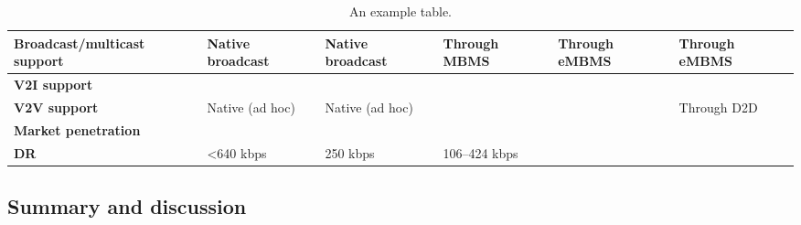 \begin{table}[h!]
\begin{tabulary}{\columnwidth}{L|L|L|L|L|L}
	\bf{Broadcast/multicast support} & Native broadcast                                      & Native broadcast                                      & Through MBMS                     & Through eMBMS            & Through eMBMS             \\\hline
	\bf{V2I support}                 & \ok                                                   & \ok                                                   & \ok                              & \ok                      & \ok                       \\\hline
	\bf{V2V support}                 & Native (ad hoc)                                       & Native (ad hoc)                                       & \ko                              & \ko                      & Through D2D               \\\hline
	\bf{Market penetration}          & \ok                                                   & \ko                                                   & \ok                              & \ok                      & \ok                       \\\hline
	\bf{\ac{DR}}                   & <640 kbps                                        & 250 kbps                                              & 106–424 kbps                              & \ok                      & \ok                       \\\hline
	\end{tabulary}
	\caption{\label{tab:Tableppp} An example table.}
\end{table}

\subsection{Summary and discussion}



